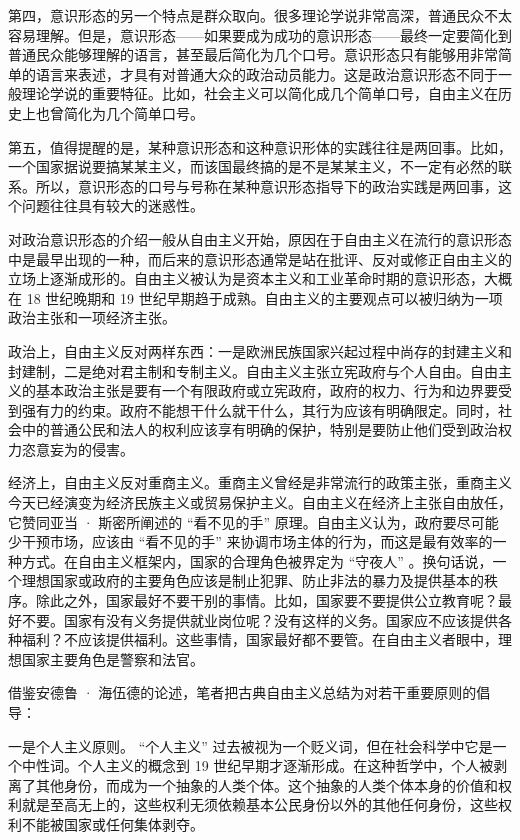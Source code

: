 第四，意识形态的另一个特点是群众取向。很多理论学说非常高深，普通民众不太容易理解。但是，意识形态——如果要成为成功的意识形态——最终一定要简化到普通民众能够理解的语言，甚至最后简化为几个口号。意识形态只有能够用非常简单的语言来表述，才具有对普通大众的政治动员能力。这是政治意识形态不同于一般理论学说的重要特征。比如，社会主义可以简化成几个简单口号，自由主义在历史上也曾简化为几个简单口号。

第五，值得提醒的是，某种意识形态和这种意识形体的实践往往是两回事。比如，一个国家据说要搞某某主义，而该国最终搞的是不是某某主义，不一定有必然的联系。所以，意识形态的口号与号称在某种意识形态指导下的政治实践是两回事，这个问题往往具有较大的迷惑性。


对政治意识形态的介绍一般从自由主义开始，原因在于自由主义在流行的意识形态中是最早出现的一种，而后来的意识形态通常是站在批评、反对或修正自由主义的立场上逐渐成形的。自由主义被认为是资本主义和工业革命时期的意识形态，大概在 18 世纪晚期和 19 世纪早期趋于成熟。自由主义的主要观点可以被归纳为一项政治主张和一项经济主张。

政治上，自由主义反对两样东西：一是欧洲民族国家兴起过程中尚存的封建主义和封建制，二是绝对君主制和专制主义。自由主义主张立宪政府与个人自由。自由主义的基本政治主张是要有一个有限政府或立宪政府，政府的权力、行为和边界要受到强有力的约束。政府不能想干什么就干什么，其行为应该有明确限定。同时，社会中的普通公民和法人的权利应该享有明确的保护，特别是要防止他们受到政治权力恣意妄为的侵害。

经济上，自由主义反对重商主义。重商主义曾经是非常流行的政策主张，重商主义今天已经演变为经济民族主义或贸易保护主义。自由主义在经济上主张自由放任，它赞同亚当 · 斯密所阐述的 “看不见的手” 原理。自由主义认为，政府要尽可能少干预市场，应该由 “看不见的手” 来协调市场主体的行为，而这是最有效率的一种方式。在自由主义框架内，国家的合理角色被界定为 “守夜人” 。换句话说，一个理想国家或政府的主要角色应该是制止犯罪、防止非法的暴力及提供基本的秩序。除此之外，国家最好不要干别的事情。比如，国家要不要提供公立教育呢？最好不要。国家有没有义务提供就业岗位呢？没有这样的义务。国家应不应该提供各种福利？不应该提供福利。这些事情，国家最好都不要管。在自由主义者眼中，理想国家主要角色是警察和法官。

借鉴安德鲁 · 海伍德的论述，笔者把古典自由主义总结为对若干重要原则的倡导：

一是个人主义原则。 “个人主义” 过去被视为一个贬义词，但在社会科学中它是一个中性词。个人主义的概念到 19 世纪早期才逐渐形成。在这种哲学中，个人被剥离了其他身份，而成为一个抽象的人类个体。这个抽象的人类个体本身的价值和权利就是至高无上的，这些权利无须依赖基本公民身份以外的其他任何身份，这些权利不能被国家或任何集体剥夺。

